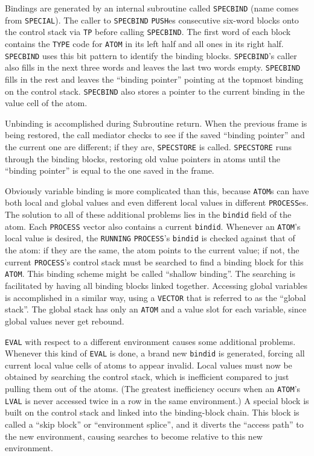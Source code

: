 \documentclass[a4paper]{scrbook}
\begin{document}
Bindings are generated by an internal subroutine called \texttt{SPECBIND} (name comes from \texttt{SPECIAL}). The caller to
\texttt{SPECBIND} \texttt{PUSH}es consecutive six-word blocks onto the control stack via \texttt{TP} before calling
\texttt{SPECBIND}. The first word of each block contains the \texttt{TYPE} code for \texttt{ATOM} in its left half and all
ones in its right half. \texttt{SPECBIND} uses this bit pattern to identify the binding blocks. \texttt{SPECBIND}'s caller
also fills in the next three words and leaves the last two words empty. \texttt{SPECBIND} fills in the rest and leaves the
``binding pointer'' pointing at the topmost binding on the control stack. \texttt{SPECBIND} also stores a pointer to the
current binding in the value cell of the atom.

Unbinding is accomplished during Subroutine return. When the previous frame is being restored, the call mediator checks to
see if the saved ``binding pointer'' and the current one are different; if they are, \texttt{SPECSTORE} is called.
\texttt{SPECSTORE} runs through the binding blocks, restoring old value pointers in atoms until the ``binding pointer'' is
equal to the one saved in the frame.

Obviously variable binding is more complicated than this, because \texttt{ATOM}s can have both local and global values and
even different local values in different \texttt{PROCESS}es. The solution to all of these additional problems lies in the
\texttt{bindid} field of the atom. Each \texttt{PROCESS} vector also contains a current \texttt{bindid}. Whenever an
\texttt{ATOM}'s local value is desired, the \texttt{RUNNING} \texttt{PROCESS}'s \texttt{bindid} is checked against that of
the atom: if they are the same, the atom points to the current value; if not, the current \texttt{PROCESS}'s control stack
must be searched to find a binding block for this \texttt{ATOM}. This binding scheme might be called ``shallow binding''.
The searching is facilitated by having all binding blocks linked together. Accessing global variables is accomplished in a
similar way, using a \texttt{VECTOR} that is referred to as the ``global stack''. The global stack has only an
\texttt{ATOM} and a value slot for each variable, since global values never get rebound.

\texttt{EVAL} with respect to a different environment causes some additional problems. Whenever this kind of \texttt{EVAL}
is done, a brand new \texttt{bindid} is generated, forcing all current local value cells of atoms to appear invalid. Local
values must now be obtained by searching the control stack, which is inefficient compared to just pulling them out of the
atoms. (The greatest inefficiency occurs when an \texttt{ATOM}'s \texttt{LVAL} is never accessed twice in a row in the same
environment.) A special block is built on the control stack and linked into the binding-block chain. This block is called a
``skip block'' or ``environment splice'', and it diverts the ``access path'' to the new environment, causing searches to
become relative to this new environment.
\end{document}
